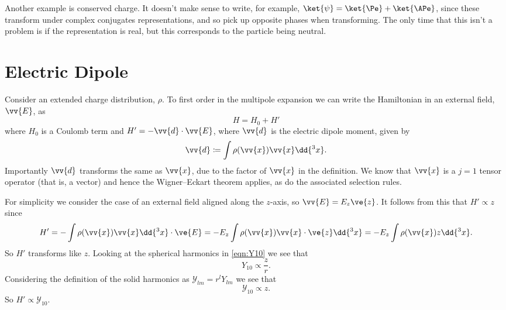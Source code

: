 \documentclass[fleqn]{NotesClass}
\begin{document}
    Another example is conserved charge.
    It doesn't make sense to write, for example, \(\ket{\psi} = \ket{\Pe} + \ket{\APe}\), since these transform under complex conjugates representations, and so pick up opposite phases when transforming.
    The only time that this isn't a problem is if the representation is real, but this corresponds to the particle being neutral.
    
    \section{Electric Dipole}
    Consider an extended charge distribution, \(\rho\).
    To first order in the multipole expansion we can write the Hamiltonian in an external field, \(\vv{E}\), as
    \begin{equation}
        H = H_0 + H'
    \end{equation}
    where \(H_0\) is a Coulomb term and \(H' = -\vv{d} \cdot \vv{E}\), where \(\vv{d}\) is the electric dipole moment, given by
    \begin{equation}
        \vv{d} \coloneqq \int \rho(\vv{x}) \vv{x} \dd{^3x}.
    \end{equation}
    Importantly \(\vv{d}\) transforms the same as \(\vv{x}\), due to the factor of \(\vv{x}\) in the definition.
    We know that \(\vv{x}\) is a \(j = 1\) tensor operator (that is, a vector) and hence the Wigner--Eckart theorem applies, as do the associated selection rules.
    
    For simplicity we consider the case of an external field aligned along the \(z\)-axis, so \(\vv{E} = E_z\ve{z}\).
    It follows from this that \(H' \propto z\) since
    \begin{equation}
        H' = -\int \rho(\vv{x}) \vv{x} \dd{^3x} \cdot \ve{E} = -E_z \int \rho(\vv{x}) \vv{x} \cdot \ve{z} \dd{^3x} = -E_z \int \rho(\vv{x}) z \dd{^3x}.
    \end{equation}
    So \(H'\) transforms like \(z\).
    Looking at the spherical harmonics in \cref{eqn:Y10} we see that
    \begin{equation}
        Y_{10} \propto \frac{z}{r}.
    \end{equation}
    Considering the definition of the solid harmonics as \(\mathcal{Y}_{lm} = r^lY_{lm}\) we see that
    \begin{equation}
        \mathcal{Y}_{10} \propto z.
    \end{equation}
    So \(H' \propto \mathcal{Y}_{10}\).
    
\end{document}

